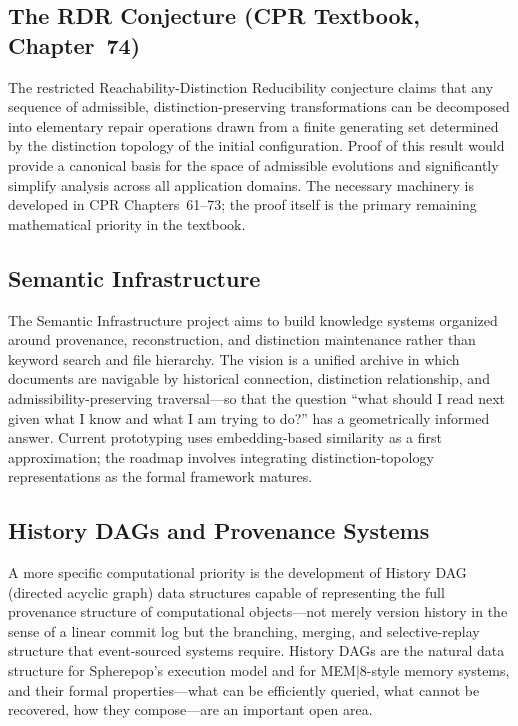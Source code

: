 \documentclass[11pt, oneside]{book}
\theoremstyle{definition}
\theoremstyle{remark}
\begin{document}
\subsection*{The RDR Conjecture (CPR Textbook, Chapter~74)}

The restricted Reachability-Distinction Reducibility conjecture claims that any sequence of admissible, distinction-preserving transformations can be decomposed into elementary repair operations drawn from a finite generating set determined by the distinction topology of the initial configuration. Proof of this result would provide a canonical basis for the space of admissible evolutions and significantly simplify analysis across all application domains. The necessary machinery is developed in CPR Chapters~61--73; the proof itself is the primary remaining mathematical priority in the textbook.

\subsection*{Semantic Infrastructure}

The Semantic Infrastructure project aims to build knowledge systems organized around provenance, reconstruction, and distinction maintenance rather than keyword search and file hierarchy. The vision is a unified archive in which documents are navigable by historical connection, distinction relationship, and admissibility-preserving traversal---so that the question ``what should I read next given what I know and what I am trying to do?'' has a geometrically informed answer. Current prototyping uses embedding-based similarity as a first approximation; the roadmap involves integrating distinction-topology representations as the formal framework matures.

\subsection*{History DAGs and Provenance Systems}

A more specific computational priority is the development of History DAG (directed acyclic graph) data structures capable of representing the full provenance structure of computational objects---not merely version history in the sense of a linear commit log but the branching, merging, and selective-replay structure that event-sourced systems require. History DAGs are the natural data structure for Spherepop's execution model and for MEM$|$8-style memory systems, and their formal properties---what can be efficiently queried, what cannot be recovered, how they compose---are an important open area.
\end{document}

